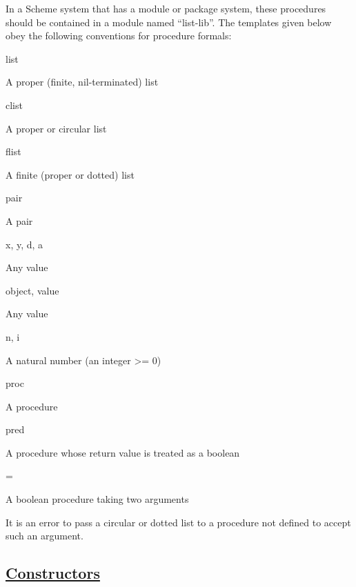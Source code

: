 In a Scheme system that has a module or package system, these procedures
should be contained in a module named ``list-lib''. The templates given
below obey the following conventions for procedure formals:

list

A proper (finite, nil-terminated) list

clist

A proper or circular list

flist

A finite (proper or dotted) list

pair

A pair

x, y, d, a

Any value

object, value

Any value

n, i

A natural number (an integer \textgreater{}= 0)

proc

A procedure

pred

A procedure whose return value is treated as a boolean

=

A boolean procedure taking two arguments

It is an error to pass a circular or dotted list to a procedure not
defined to accept such an argument.

\subsection{\texorpdfstring{\href{}{Constructors}}{Constructors}}\label{constructors}


